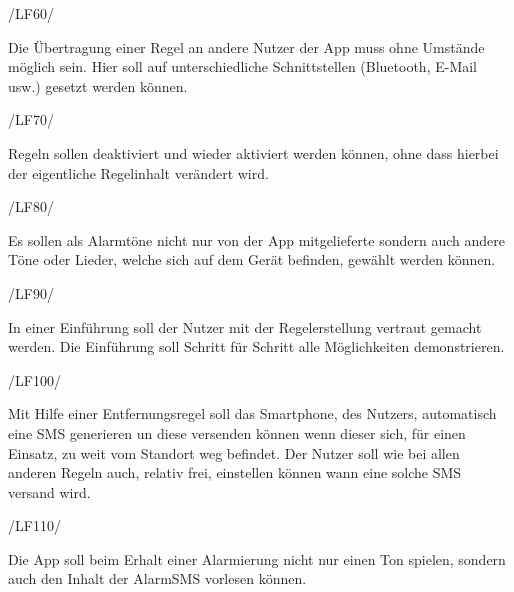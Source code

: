 \begin{minipage}{3cm}
/LF60/
\end{minipage}
\begin{minipage}{13cm}
Die \"Ubertragung einer Regel an andere Nutzer der App muss ohne Umst\"ande m\"oglich sein. Hier soll auf unterschiedliche Schnittstellen (Bluetooth, E-Mail usw.) gesetzt werden k\"onnen. \\
\end{minipage}
\begin{minipage}{3cm}
/LF70/
\end{minipage}
\begin{minipage}{13cm}
Regeln sollen deaktiviert und wieder aktiviert werden k\"onnen, ohne dass hierbei der eigentliche Regelinhalt ver\"andert wird.
\end{minipage}
\begin{minipage}{3cm}
/LF80/
\end{minipage}
\begin{minipage}{13cm}
Es sollen als Alarmt\"one nicht nur von der App mitgelieferte sondern auch andere T\"one oder Lieder, welche sich auf dem Ger\"at befinden, gew\"ahlt werden k\"onnen.\\
\end{minipage}
\begin{minipage}{3cm}
/LF90/
\end{minipage}
\begin{minipage}{13cm}
In einer Einf\"uhrung soll der Nutzer mit der Regelerstellung vertraut gemacht werden. Die Einf\"uhrung soll Schritt f\"ur Schritt alle M\"oglichkeiten demonstrieren.\\
\end{minipage}
\begin{minipage}{3cm}
/LF100/
\end{minipage}
\begin{minipage}{13cm}
Mit Hilfe einer Entfernungsregel soll das Smartphone, des Nutzers, automatisch eine SMS generieren un diese versenden k\"onnen wenn dieser sich, f\"ur einen Einsatz, zu weit vom Standort weg befindet.
Der Nutzer soll wie bei allen anderen Regeln auch, relativ frei, einstellen k\"onnen wann eine solche SMS versand wird.\\
\end{minipage}
\begin{minipage}{3cm}
/LF110/
\end{minipage}
\begin{minipage}{13cm}
Die App soll beim Erhalt einer Alarmierung nicht nur einen Ton spielen, sondern auch den Inhalt der AlarmSMS vorlesen k\"onnen.\\
\end{minipage}

